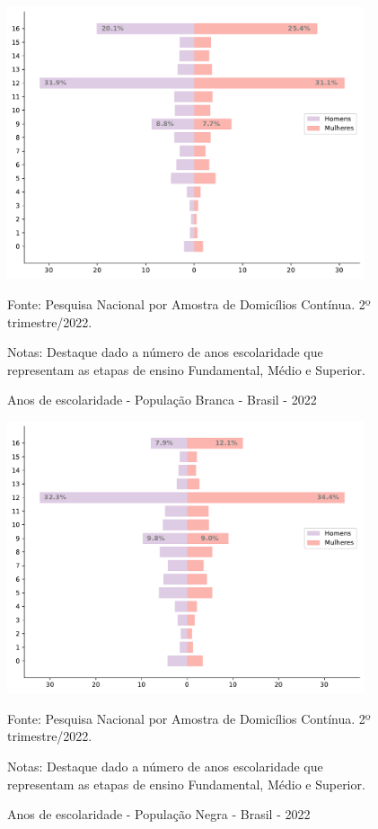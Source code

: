 \documentclass[12pt]{article}
\begin{document}
\begin{figure}[H]
    \centering
    \caption{Anos de escolaridade - População Branca - Brasil - 2022}
        \includegraphics[height=8cm]{../figures/schooling_white.pdf}
    \label{fig:white_schooling}
    \begin{floatnotes}
        \item[Fonte:] Pesquisa Nacional por Amostra de Domicílios Contínua. 2º trimestre/2022.
        \item[Notas:] Destaque dado a número de anos escolaridade que representam as etapas de ensino Fundamental, Médio e Superior.
    \end{floatnotes}
\end{figure}

\begin{figure}[H]
    \centering
    \caption{Anos de escolaridade - População Negra - Brasil - 2022}
        \includegraphics[height=8cm]{../figures/schooling_black.pdf}
    \label{fig:black_schooling}
    \begin{floatnotes}
        \item[Fonte:] Pesquisa Nacional por Amostra de Domicílios Contínua. 2º trimestre/2022.
        \item[Notas:] Destaque dado a número de anos escolaridade que representam as etapas de ensino Fundamental, Médio e Superior.
    \end{floatnotes}
\end{figure}

\printbibliography[title={Bibliografia}, nottype=misc]
\end{document}

